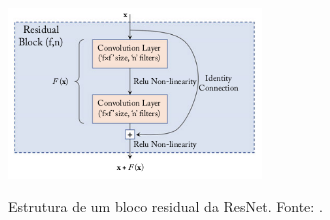 \begin{figure}[h!]
  \centering
  \caption{Estrutura de um bloco residual da ResNet. Fonte: \cite{khan}.}
  \includegraphics[width=0.6\textwidth]{imgs/residual-block}
  \label{fig:residual-block}
\end{figure}


